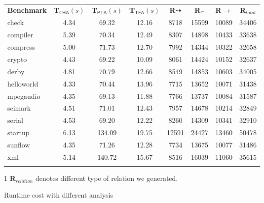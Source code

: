 \documentclass{fac}
\newcommand{\less}{\sqsubseteq}
\newcommand{\tflow}{\dashrightarrow}
\begin{document}
\begin{figure}\centering
\begin{threeparttable}[b]
\begin{tabular}{lccccccc}
	\fullhline
	\textbf{Benchmark} & \hspace{5pt}\textbf{T$_{\textsf{CHA}}(s)$}& \hspace{5pt}\textbf{T$_{\textsf{PTA}}(s)$} & \hspace{5pt}\textbf{T$_{\textsf{TFA}}(s)$} & \hspace{10pt}\textbf{R${\tflow}$}\hspace{10pt} & \hspace{10pt}\textbf{R$_{\less}$}\hspace{10pt} & \hspace{10pt}\textbf{R${\rightarrow}$}\hspace{10pt} &\hspace{10pt}\textbf{R$_{total}$}\hspace{10pt}\\
	\fullhline
check & 4.34 & 69.32 & 12.16 & 8718 & 15599 & 10089 & 34406\\
compiler & 5.39 & 70.34 & 12.49 & 8307 & 14898 & 10433 & 33638\\
compress & 5.00 & 71.73 & 12.70 & 7992 & 14344 & 10322 & 32658\\
crypto & 4.43 & 69.22 & 10.09 & 8061 & 14424 & 10152 & 32637\\
derby & 4.81 & 70.79 & 12.66 & 8549 & 14853 & 10603 & 34005\\
helloworld & 4.33 & 70.44 & 13.96 & 7715 & 13652 & 10071 & 31438\\
mpegaudio & 4.35 & 69.13 & 11.88 & 7766 & 13737 & 10084 & 31587\\
scimark & 4.51 & 71.01 & 12.43 & 7957 & 14678 & 10214 & 32849\\
serial & 4.53 & 69.20 & 12.22 & 8260 & 14309 & 10341 & 32910\\
startup & 6.13 & 134.09 & 19.75 & 12591 & 24427 & 13460 & 50478\\
sunflow & 4.35 & 71.26 & 12.28 & 7734 & 13675 & 10077 & 31486\\
xml & 5.14 & 140.72 & 15.67 & 8516 & 16039 & 11060 & 35615\\
	\fullhline
\end{tabular}
\caption{Runtime cost with different analysis}
\label{fig:TimeCost}
\begin{tablenotes}
  \item[1] \textbf{R}$_{relation}$ denotes different type of relation we generated.
\end{tablenotes}
\end{threeparttable}
\end{figure}
\end{document}
